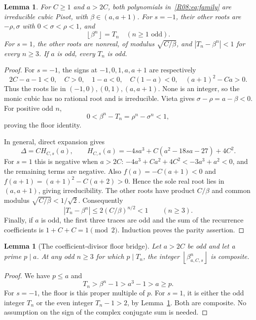\documentclass[11pt,a4paper]{article}
\newtheorem{lemma}[theorem]{Lemma}\newtheorem{proposition}[theorem]{Proposition}
\theoremstyle{definition}\newtheorem{definition}[theorem]{Definition}
\theoremstyle{remark}\newtheorem{remark}[theorem]{Remark}
\newcommand{\floor}[1]{\left\lfloor#1\right\rfloor}
\begin{document}
\begin{lemma}\label{R08:lem:roots}
For $C\ge1$ and $a>2C$, both polynomials in~\eqref{R08:eq:family}
are irreducible cubic Pisot, with $\beta\in(a,a+1)$.
For $s=-1$, their other roots are $-\rho,\sigma$ with
$0<\sigma<\rho<1$, and
\[
                     \floor{\beta^n}=T_n\quad(n\ge1\text{ odd}).
\]
For $s=1$, the other roots are nonreal, of modulus $\sqrt{C/\beta}$,
and $|T_n-\beta^n|<1$ for every $n\ge3$.
If $a$ is odd, every $T_n$ is odd.
\end{lemma}
\begin{proof}
For $s=-1$, the signs at $-1,0,1,a,a+1$ are respectively
\[
 2C-a-1<0,\quad C>0,\quad1-a<0,\quad C(1-a)<0,
 \quad(a+1)^2-Ca>0.
\]
Thus the roots lie in $(-1,0),(0,1),(a,a+1)$.
None is an integer, so the monic cubic has no rational root and is
irreducible. Vieta gives $\sigma-\rho=a-\beta<0$. For positive odd $n$,
\[
                  0<\beta^n-T_n=\rho^n-\sigma^n<1,
\]
proving the floor identity.

In general, direct expansion gives
\begin{equation}\label{R08:eq:discriminant}
 \Delta=C H_{C,s}(a),\qquad
 H_{C,s}(a)=-4sa^3+C(a^2-18sa-27)+4C^2.
\end{equation}
For $s=1$ this is negative when $a>2C$:
$-4a^3+Ca^2+4C^2<-3a^3+a^2<0$, and the remaining terms are negative.
Also $f(a)=-C(a+1)<0$ and
$f(a+1)=(a+1)^2-C(a+2)>0$.
Hence the sole real root lies in $(a,a+1)$, giving irreducibility.
The other roots have product $C/\beta$ and common modulus
$\sqrt{C/\beta}<1/\sqrt2$. Consequently
\[
             |T_n-\beta^n|\le2(C/\beta)^{n/2}<1\qquad(n\ge3).
\]
Finally, if $a$ is odd, the first three traces are odd and the sum of
the recurrence coefficients is $1+C+C=1\pmod2$.
Induction proves the parity assertion.
\end{proof}

\begin{lemma}[The coefficient-divisor floor bridge]\label{R08:lem:floor}
Let $a>2C$ be odd and let a prime $p\mid a$. At any odd $n\ge3$
for which $p\mid T_n$, the integer $\floor{\beta_{a,C,s}^n}$ is composite.
\end{lemma}
\begin{proof}
We have $p\le a$ and
\[
                    T_n>\beta^n-1>a^3-1>a\ge p.
\]
For $s=-1$, the floor is this proper multiple of $p$.
For $s=1$, it is either the odd integer $T_n$ or the even integer
$T_n-1>2$, by Lemma~\ref{R08:lem:roots}. Both are composite.
No assumption on the sign of the complex conjugate sum is needed.
\end{proof}
\end{document}
